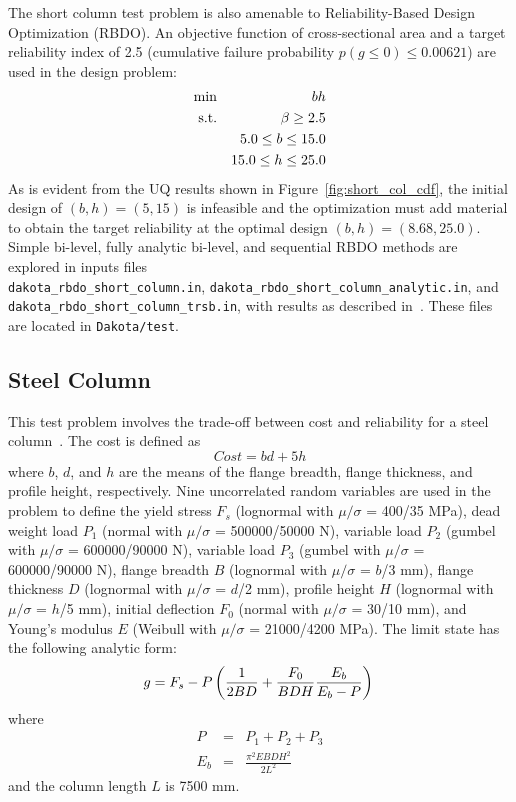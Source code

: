 The short column test problem is also amenable to Reliability-Based Design Optimization (RBDO). An
objective function of cross-sectional area and a target reliability
index of 2.5 (cumulative failure probability $p(g \le 0) \le 0.00621$)
are used in the design problem:
\begin{eqnarray}
\min       & & bh \nonumber \\
{\rm s.t.} & & \beta \geq 2.5 \nonumber \\
           & &  5.0 \leq b \leq 15.0 \nonumber \\
           & & 15.0 \leq h \leq 25.0
\end{eqnarray}
As is evident from the UQ results shown in
Figure~\ref{fig:short_col_cdf}, the initial design of $(b, h) = (5,
15)$ is infeasible and the optimization must add material to obtain
the target reliability at the optimal design $(b, h) = (8.68, 25.0)$.
Simple bi-level, fully analytic bi-level, and sequential RBDO methods
are explored in inputs files \\
\texttt{dakota\_rbdo\_short\_column.in},
\texttt{dakota\_rbdo\_short\_column\_analytic.in}, and\\
\texttt{dakota\_rbdo\_short\_column\_trsb.in}, with results as
described in~\cite{Eld05,Eld06a}. These files are located in {\tt Dakota/test}.

\subsection{Steel Column}\label{additional:steel_column}

This test problem involves the trade-off between cost and
reliability for a steel column~\cite{Kus97}. The cost is defined as
\begin{equation}
Cost = b d + 5 h
\end{equation}
where $b$, $d$, and $h$ are the means of the flange breadth, flange
thickness, and profile height, respectively. Nine uncorrelated random
variables are used in the problem to define the yield stress $F_s$
(lognormal with $\mu/\sigma$ = 400/35 MPa), dead weight load $P_1$
(normal with $\mu/\sigma$ = 500000/50000 N), variable load $P_2$
(gumbel with $\mu/\sigma$ = 600000/90000 N), variable load $P_3$
(gumbel with $\mu/\sigma$ = 600000/90000 N), flange breadth $B$
(lognormal with $\mu/\sigma$ = $b$/3 mm), flange thickness $D$
(lognormal with $\mu/\sigma$ = $d$/2 mm), profile height $H$
(lognormal with $\mu/\sigma$ = $h$/5 mm), initial deflection $F_0$
(normal with $\mu/\sigma$ = 30/10 mm), and Young's modulus $E$ (Weibull
with $\mu/\sigma$ = 21000/4200 MPa). The limit state has the
following analytic form:
\begin{equation}
g = F_s - P \left( \frac{1}{2 B D} +
\frac{F_0}{B D H} \frac{E_b}{E_b - P} \right)\\
\end{equation}
where
\begin{eqnarray}
P   & = & P_1 + P_2 + P_3 \\
E_b & = & \frac{\pi^2 E B D H^2}{2 L^2}
\end{eqnarray}
and the column length $L$ is 7500 mm.

